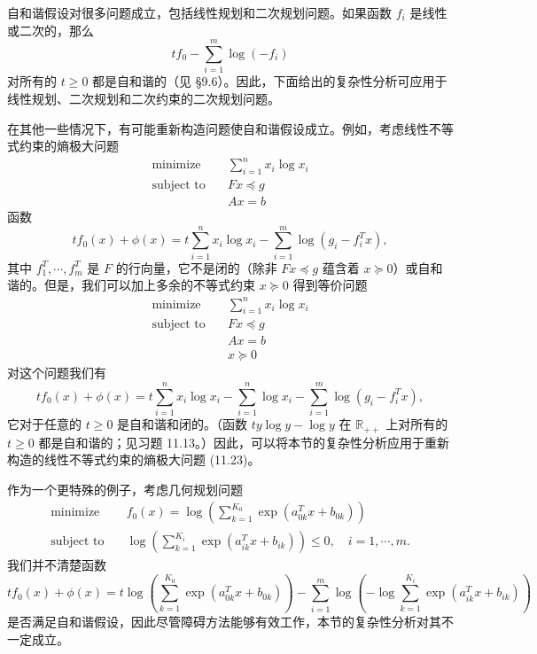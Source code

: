 \documentclass[UTF8, 12pt, fontset=fandol, oneside]{ctexart}
\begin{document}
自和谐假设对很多问题成立，包括线性规划和二次规划问题。如果函数 $f_i$ 是线性或二次的，那么
\[
tf_0-\sum_{i=1}^m\log(-f_i)
\]
对所有的 $t\geq 0$ 都是自和谐的（见 \S9.6）。因此，下面给出的复杂性分析可应用于线性规划、二次规划和二次约束的二次规划问题。

在其他一些情况下，有可能重新构造问题使自和谐假设成立。例如，考虑线性不等式约束的熵极大问题
\[
\begin{aligned}
\text{minimize}\quad & \sum_{i=1}^n x_i\log x_i\\
\text{subject to}\quad & Fx\preceq g\\
& Ax=b
\end{aligned}
\]
函数
\[
tf_0(x)+\phi(x)=t\sum_{i=1}^n x_i\log x_i-\sum_{i=1}^m\log(g_i-f_i^Tx),
\]
其中 $f_1^T,\cdots,f_m^T$ 是 $F$ 的行向量，它不是闭的（除非 $Fx\preceq g$ 蕴含着 $x\succeq 0$）或自和谐的。但是，我们可以加上多余的不等式约束 $x\succeq 0$ 得到等价问题
\begin{equation}
\begin{aligned}
\text{minimize}\quad & \sum_{i=1}^n x_i\log x_i\\
\text{subject to}\quad & Fx\preceq g\\
& Ax=b\\
& x\succeq 0
\end{aligned}
\tag{11.23}
\end{equation}
对这个问题我们有
\[
tf_0(x)+\phi(x)=t\sum_{i=1}^n x_i\log x_i-\sum_{i=1}^n\log x_i-\sum_{i=1}^m\log(g_i-f_i^Tx),
\]
它对于任意的 $t\geq 0$ 是自和谐和闭的。（函数 $ty\log y-\log y$ 在 $\mathbb{R}_{++}$ 上对所有的 $t\geq 0$ 都是自和谐的；见习题 11.13。）因此，可以将本节的复杂性分析应用于重新构造的线性不等式约束的熵极大问题 (11.23)。

作为一个更特殊的例子，考虑几何规划问题
\[
\begin{aligned}
\text{minimize}\quad & f_0(x)=\log\left(\sum_{k=1}^{K_0}\exp(a_{0k}^Tx+b_{0k})\right)\\
\text{subject to}\quad & \log\left(\sum_{k=1}^{K_i}\exp(a_{ik}^Tx+b_{ik})\right)\leq 0,\quad i=1,\cdots,m.
\end{aligned}
\]
我们并不清楚函数
\[
tf_0(x)+\phi(x)=t\log\left(\sum_{k=1}^{K_0}\exp(a_{0k}^Tx+b_{0k})\right)
-\sum_{i=1}^m\log\left(-\log\sum_{k=1}^{K_i}\exp(a_{ik}^Tx+b_{ik})\right)
\]
是否满足自和谐假设，因此尽管障碍方法能够有效工作，本节的复杂性分析对其不一定成立。
\end{document}
